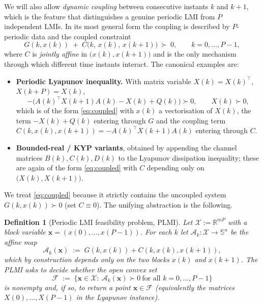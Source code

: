 \documentclass{amsart}
\newtheorem{definition}{Definition}
\newcommand{\Sym}{\mathbb{S}}
\newcommand{\R}{\mathbb{R}}
\begin{document}
We will also allow \emph{dynamic coupling} between consecutive instants $k$ and
$k+1$, which is the feature that distinguishes a genuine periodic LMI from $P$
independent LMIs. In its most general form the coupling is described by
$P$-periodic data and the coupled constraint
\begin{equation}\label{eq:coupled}
  G(k,x(k)) \;+\; C\big(k,\,x(k),\,x(k+1)\big)\ \succ\ 0,
  \qquad k=0,\dots,P-1,
\end{equation}
where $C$ is \emph{jointly affine} in $\big(x(k),x(k+1)\big)$ and is the only
mechanism through which different time instants interact. The canonical examples
are:

\begin{itemize}
\item \textbf{Periodic Lyapunov inequality.}
With matrix variable $X(k)=X(k)^{\!\top}$, $X(k+P)=X(k)$,
\begin{equation}\label{eq:lyap}
  -\big(A(k)^{\!\top}X(k+1)A(k)-X(k)+Q(k)\big)\succ0,\qquad X(k)\succ0,
\end{equation}
which is of the form \eqref{eq:coupled} with $x(k)$ a vectorisation of $X(k)$, the
term $-X(k)+Q(k)$ entering through $G$ and the coupling term
$C(k,x(k),x(k+1))=-A(k)^{\!\top}X(k+1)A(k)$ entering through $C$.
\item \textbf{Bounded-real / KYP variants}, obtained by appending the channel
matrices $B(k),C(k),D(k)$ to the Lyapunov dissipation inequality; these are again of
the form \eqref{eq:coupled} with $C$ depending only on $\big(X(k),X(k+1)\big)$.
\end{itemize}

We treat \eqref{eq:coupled} because it strictly contains the uncoupled system
$G(k,x(k))\succ0$ (set $C\equiv0$). The unifying abstraction is the following.

\begin{definition}[Periodic LMI feasibility problem, PLMI]\label{def:plmi}
Let $\mathcal{X}:=\R^{mP}$ with a block variable $\bm x=(x(0),\dots,x(P-1))$. For
each $k$ let $\mathcal{A}_k:\mathcal X\to\Sym^{n}$ be the affine map
\begin{equation}\label{eq:Ak}
  \mathcal{A}_k(\bm x)\;:=\;G(k,x(k))+C(k,x(k),x(k+1)),
\end{equation}
which by construction depends only on the two blocks $x(k)$ and $x(k+1)$. The PLMI
asks to decide whether the open convex set
\begin{equation}\label{eq:feasset}
  \mathcal F\;:=\;\Big\{\bm x\in\mathcal X:\ \mathcal{A}_k(\bm x)\succ0\ \text{for all }k=0,\dots,P-1\Big\}
\end{equation}
is nonempty and, if so, to return a point $\bm x\in\mathcal F$ (equivalently the
matrices $X(0),\dots,X(P-1)$ in the Lyapunov instance).
\end{definition}
\end{document}
